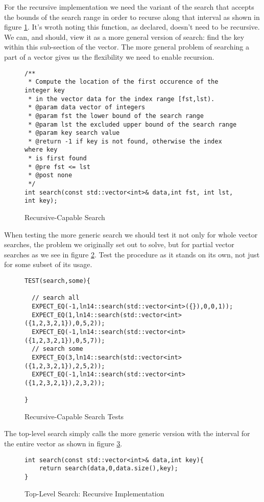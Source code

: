 \documentclass[]{tufte-handout}
\begin{document}
For the recursive implementation we need the variant of the search that accepts the bounds of the search range in order to recurse along that interval as shown in figure \ref{code:searchrecdecl}. It's wroth noting this function, as declared, doesn't need to be recursive. We can, and should, view it as a more general version of search: find the key within this sub-section of the vector. The more general problem of searching a part of a vector gives us the flexibility we need to enable recursion.

\begin{figure}[htpb!]
\begin{lstlisting}
/**
 * Compute the location of the first occurence of the integer key
 * in the vector data for the index range [fst,lst).
 * @param data vector of integers
 * @param fst the lower bound of the search range
 * @param lst the excluded upper bound of the search range
 * @param key search value
 * @return -1 if key is not found, otherwise the index where key
 * is first found
 * @pre fst <= lst
 * @post none
 */
int search(const std::vector<int>& data,int fst, int lst, int key);
\end{lstlisting}
\label{code:searchrecdecl}
\caption{Recursive-Capable Search}
\end{figure}

When testing the more generic search we should test it not only for whole vector searches, the problem we originally set out to solve, but for partial vector searches as we see in figure \ref{code:searchrectests}.  Test the procedure as it stands on its own, not just for some subset of its usage.
\begin{figure}[htpb!]
\begin{lstlisting}
TEST(search,some){

  // search all
  EXPECT_EQ(-1,ln14::search(std::vector<int>({}),0,0,1));
  EXPECT_EQ(1,ln14::search(std::vector<int>({1,2,3,2,1}),0,5,2));
  EXPECT_EQ(-1,ln14::search(std::vector<int>({1,2,3,2,1}),0,5,7));
  // search some
  EXPECT_EQ(3,ln14::search(std::vector<int>({1,2,3,2,1}),2,5,2));
  EXPECT_EQ(-1,ln14::search(std::vector<int>({1,2,3,2,1}),2,3,2));

}
\end{lstlisting}
\label{code:searchrectests}
\caption{Recursive-Capable Search Tests}
\end{figure}

The top-level search simply calls the more generic version with the interval for the entire vector as shown in figure \ref{code:searchrectop}.
\begin{figure}[htpb!]
\begin{lstlisting}
int search(const std::vector<int>& data,int key){
	return search(data,0,data.size(),key);
}
\end{lstlisting}
\label{code:searchrectop}
\caption{Top-Level Search: Recursive Implementation}
\end{figure}
\end{document}
